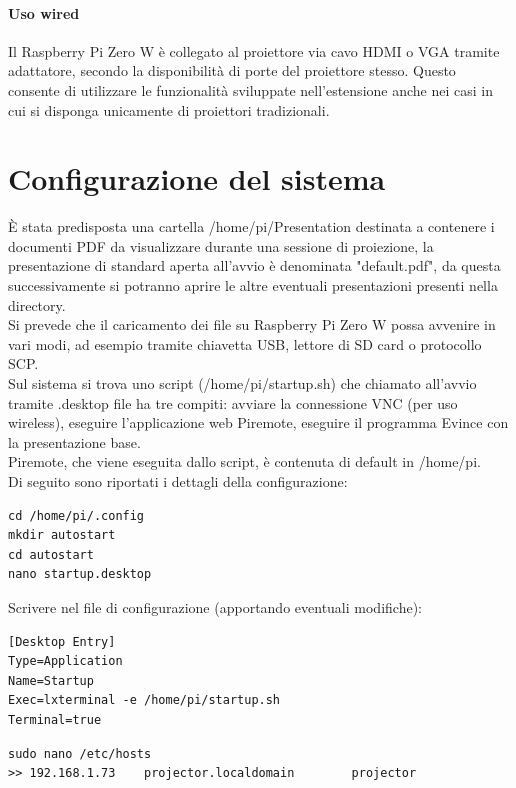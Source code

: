 \paragraph{Uso wired}
Il Raspberry Pi Zero W è collegato al proiettore via cavo HDMI o VGA tramite adattatore, secondo la disponibilità di porte del proiettore stesso.
Questo consente di utilizzare le funzionalità sviluppate nell'estensione anche nei casi in cui si disponga unicamente di proiettori tradizionali.

\section{Configurazione del sistema} %

È stata predisposta una cartella /home/pi/Presentation destinata a contenere i documenti PDF da visualizzare durante una sessione di proiezione, la presentazione di standard aperta all'avvio è denominata "default.pdf", da questa successivamente si potranno aprire le altre eventuali presentazioni presenti nella directory.\\
Si prevede che il caricamento dei file su Raspberry Pi Zero W possa avvenire in vari modi, ad esempio tramite chiavetta USB, lettore di SD card o protocollo SCP.\\
Sul sistema si trova uno script (/home/pi/startup.sh) che chiamato all'avvio tramite .desktop file ha tre compiti: avviare la connessione VNC (per uso wireless), eseguire l'applicazione web Piremote, eseguire il programma Evince con la presentazione base.\\

Piremote, che viene eseguita dallo script, è contenuta di default in /home/pi.\\
\noindent Di seguito sono riportati i dettagli della configurazione:\\

\begin{lstlisting}
cd /home/pi/.config
mkdir autostart
cd autostart
nano startup.desktop
\end{lstlisting}

\noindent Scrivere nel file di configurazione (apportando eventuali modifiche):

\begin{lstlisting}
[Desktop Entry]
Type=Application
Name=Startup
Exec=lxterminal -e /home/pi/startup.sh
Terminal=true
\end{lstlisting}

\begin{lstlisting}
sudo nano /etc/hosts
>> 192.168.1.73    projector.localdomain        projector
\end{lstlisting}

